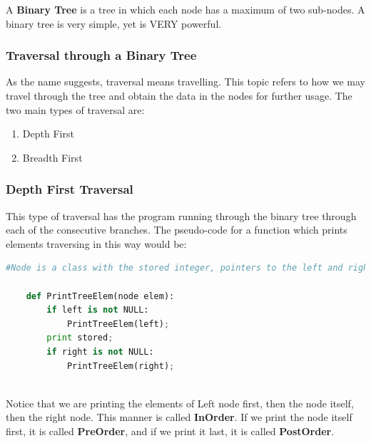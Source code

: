 \documentclass{article}
\theoremstyle{definition}
\theoremstyle{example}
\begin{document}
A \textbf{Binary Tree} is a tree in which each node has a maximum of two sub-nodes. A binary tree is very simple, yet is VERY powerful.\newpage

\subsubsection{\Large Traversal through a Binary Tree}
\hspace{4mm}As the name suggests, traversal means travelling. This topic refers to how we may travel through the tree and obtain the data in the nodes for further usage. The two main types of traversal are:
\begin{enumerate}
    \item Depth First
    \item Breadth First
\end{enumerate}
\subsubsection*{\Large Depth First Traversal}
\hspace{4mm} This type of traversal has the program running through the binary tree through each of the consecutive branches. The pseudo-code for a function which prints elements traversing in this way would be:\par
\vspace{3mm}
\begin{lstlisting}[basicstyle = \Large, language = python]
    #Node is a class with the stored integer, pointers to the left and right side.
    
    def PrintTreeElem(node elem):
        if left is not NULL:
            PrintTreeElem(left);
        print stored;
        if right is not NULL:
            PrintTreeElem(right);
        
\end{lstlisting}
\vspace{4mm}
\hspace{4mm}Notice that we are printing the elements of Left node first, then the node itself, then the right node. This manner is called \textbf{InOrder}. If we print the node itself first, it is called \textbf{PreOrder}, and if we print it last, it is called \textbf{PostOrder}.
\end{document}
